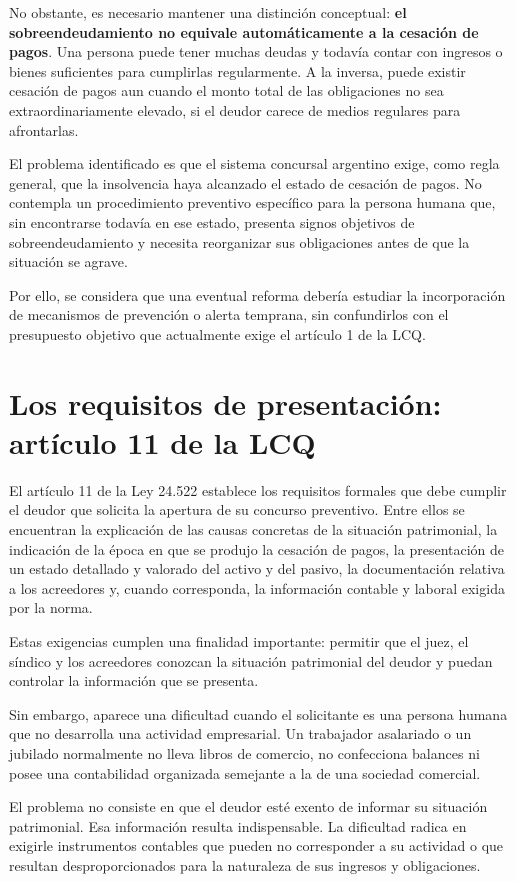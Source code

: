 \documentclass[12pt,oneside]{book}
\begin{document}
No obstante, es necesario mantener una distinción conceptual: \textbf{el sobreendeudamiento no equivale automáticamente a la cesación de pagos}. Una persona puede tener muchas deudas y todavía contar con ingresos o bienes suficientes para cumplirlas regularmente. A la inversa, puede existir cesación de pagos aun cuando el monto total de las obligaciones no sea extraordinariamente elevado, si el deudor carece de medios regulares para afrontarlas.

El problema identificado es que el sistema concursal argentino exige, como regla general, que la insolvencia haya alcanzado el estado de cesación de pagos. No contempla un procedimiento preventivo específico para la persona humana que, sin encontrarse todavía en ese estado, presenta signos objetivos de sobreendeudamiento y necesita reorganizar sus obligaciones antes de que la situación se agrave.

Por ello, se considera que una eventual reforma debería estudiar la incorporación de mecanismos de prevención o alerta temprana, sin confundirlos con el presupuesto objetivo que actualmente exige el artículo 1 de la LCQ.

\section{Los requisitos de presentación: artículo 11 de la LCQ}

El artículo 11 de la Ley 24.522 establece los requisitos formales que debe cumplir el deudor que solicita la apertura de su concurso preventivo. Entre ellos se encuentran la explicación de las causas concretas de la situación patrimonial, la indicación de la época en que se produjo la cesación de pagos, la presentación de un estado detallado y valorado del activo y del pasivo, la documentación relativa a los acreedores y, cuando corresponda, la información contable y laboral exigida por la norma.

Estas exigencias cumplen una finalidad importante: permitir que el juez, el síndico y los acreedores conozcan la situación patrimonial del deudor y puedan controlar la información que se presenta.

Sin embargo, aparece una dificultad cuando el solicitante es una persona humana que no desarrolla una actividad empresarial. Un trabajador asalariado o un jubilado normalmente no lleva libros de comercio, no confecciona balances ni posee una contabilidad organizada semejante a la de una sociedad comercial.

El problema no consiste en que el deudor esté exento de informar su situación patrimonial. Esa información resulta indispensable. La dificultad radica en exigirle instrumentos contables que pueden no corresponder a su actividad o que resultan desproporcionados para la naturaleza de sus ingresos y obligaciones.
\end{document}
